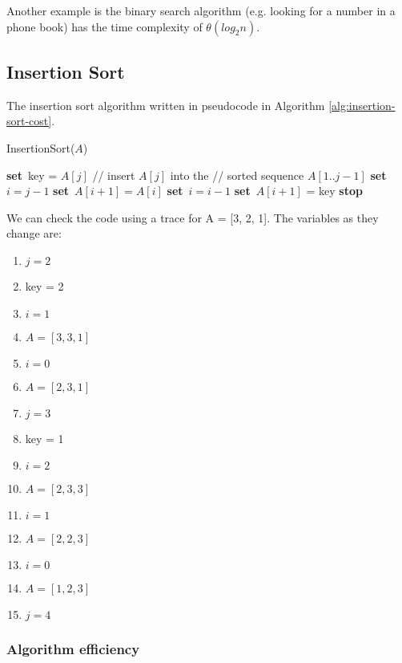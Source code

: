 \documentclass[]{article}
\newcommand{\Set}{\State \textbf{set}~}
\newcommand{\Stop}{\State \textbf{stop}~}
\begin{document}
Another example is the binary search algorithm (e.g. looking for a number in a phone book) has the time complexity of $\theta(log_2n)$.\\

\subsection{Insertion Sort}

The insertion sort algorithm written in pseudocode in Algorithm \ref{alg:insertion-sort-cost}.

\begin{algorithm}[bh!]
	\caption{InsertionSort($A$)}
	\label{alg:insertion-sort-cost}
	\begin{algorithmic}[1]
			\Set key = $A[j]$
			\State // insert $A[j]$ into the
			\State // sorted sequence $A[1..j-1]$
			\Set $i = j - 1$
				\Set $A[i+1] = A[i]$
				\Set $i = i-1$
				\Set $A[i+1]$ = key
			\EndWhile
		\EndFor
		\Stop
	\end{algorithmic}
\end{algorithm}\bigbreak

We can check the code using a trace for A = [3, 2, 1]. The variables as they change are:\\
\begin{enumerate}
	\itemsep0em
	\item $j = 2$
	\item key = 2
	\item $i = 1$
	\item $A = [3, 3, 1]$
	\item $i = 0$
	\item $A = [2, 3, 1]$
	\item $j = 3$
	\item key = 1
	\item $i = 2$
	\item $A = [2, 3, 3]$
	\item $i = 1$
	\item $A = [2, 2, 3]$
	\item $i = 0$
	\item $A = [1, 2, 3]$
	\item $j = 4$
\end{enumerate}

\subsubsection{Algorithm efficiency}
\end{document}

